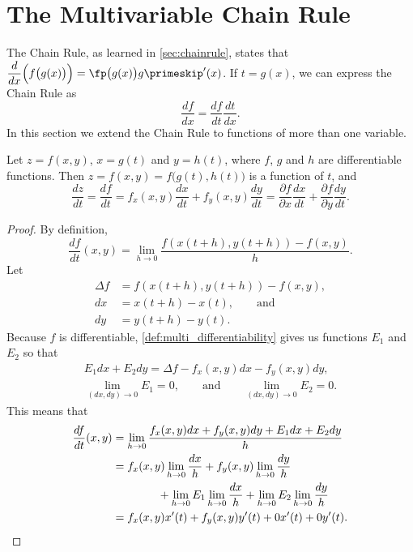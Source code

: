 \section{The Multivariable Chain Rule}\label{sec:multi_chain}

The Chain Rule, as learned in \autoref{sec:chainrule}, states that $\dfrac{d}{dx}\Big(f\big(g(x)\big)\Big) = \fp\big(g(x)\big)g\primeskip'(x)$. If $t=g(x)$, we can express the Chain Rule as 
\[\frac{df}{dx} = \frac{df}{dt}\frac{dt}{dx}.\]
In this section we extend the Chain Rule to functions of more than one variable.

\begin{theorem}\label{thm:multi_chain}
Let $z=f(x,y)$, $x=g(t)$ and $y=h(t)$, where $f$, $g$ and $h$ are differentiable functions. Then $z = f(x,y) = f\big(g(t),h(t)\big)$ is a function of $t$, and 
\[
	\frac{dz}{dt} = \frac{df}{dt}
	= f_x(x,y)\frac{dx}{dt}+f_y(x,y)\frac{dy}{dt}
	= \frac{\partial f}{\partial x}\frac{dx}{dt}
	+\frac{\partial f}{\partial y}\frac{dy}{dt}.
\]
\end{theorem}

\begin{proof}
By definition,
\[\frac{df}{dt}(x,y)=\lim_{h\to0}\frac{f(x(t+h),y(t+h))-f(x,y)}h.\]
Let
\begin{align*}
 \Delta f&=f(x(t+h),y(t+h))-f(x,y), \\
 dx&=x(t+h)-x(t),\qquad\text{and} \\
 dy&=y(t+h)-y(t).
\end{align*}
Because $f$ is differentiable, \autoref{def:multi_differentiability} gives us functions $E_1$ and $E_2$ so that
\begin{gather*}
 E_1 dx+E_2 dy = \Delta f-f_x(x,y)dx-f_y(x,y)dy,\\
 \lim_{(dx,dy)\to0}E_1=0,\qquad\text{and}\qquad
 \lim_{(dx,dy)\to0}E_2=0.
\end{gather*}
This means that
\begin{align*}
 \frac{df}{dt}(x,y)
 &=\lim_{h\to0}\frac{f_x(x,y)dx+f_y(x,y)dy+E_1 dx+E_2 dy}h \\
 &=f_x(x,y)\lim_{h\to0}\frac{dx}h+f_y(x,y)\lim_{h\to0}\frac{dy}h \\
 &\qquad\qquad\mbox{}
 +\lim_{h\to0}E_1\lim_{h\to0}\frac{dx}h+\lim_{h\to0}E_2\lim_{h\to0}\frac{dy}h \\
 &=f_x(x,y)x'(t)+f_y(x,y)y'(t)+0x'(t)+0y'(t).\qedhere
\end{align*}
\end{proof}

